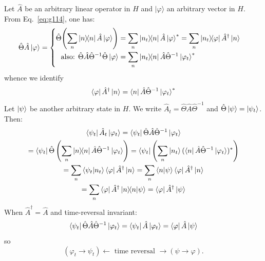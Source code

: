 \documentclass[12pt]{article}
\newcommand{\be}{\begin{equation}}
\newcommand{\ee}{\end{equation}}
\begin{document}
Let $\hat{A}$ be an arbitrary linear operator in $H$ and
$|\varphi\rangle$ an arbitrary vector in $H$. From Eq.~\eqref{eq:g114},
one has:
\be
\hat{\Theta} \hat{A} \ket{\varphi}=
\begin{cases}
\begin{aligned}
\hat{\Theta}\!\left(\sum_n\op{n}\hat{A}\ket{\varphi}\right) 
&= \sum_n \op{n_t}{n}\hat{A}\ket{\varphi}^*
= \sum_n \op{n_t}{\varphi}\hat{A}^{\dagger}\ket{n}\\
\text{also: }\hat{\Theta}\hat{A}\hat{\Theta}^{-1}\hat{\Theta}\ket{\varphi} 
&= \sum_n \op{n_t}{n}\hat{A}\hat{\Theta}^{-1}\ket{\varphi_t}^*
\end{aligned}
\end{cases}
\ee
whence we identify
\[
\bra{\varphi}\hat{A}^{\dagger}\ket{n} = \bra{n}\hat{A}\hat{\Theta}^{-1}\ket{\varphi_t}^*
\]
%
Let $\ket{\psi}$ be another arbitrary state in $H$. We write 
$\hat{A}_t = \hat{\Theta}\hat{A}\hat{\Theta}^{-1}$
and
$\hat{\Theta}\ket{\psi} = \ket{\psi_t}$.
Then:
\be
\begin{gathered}
\bra{\psi_t}\hat{A}_t\ket{\varphi_t} =
\bra{\psi_t}\hat{\Theta}\hat{A}\hat{\Theta}^{-1}\ket{\varphi_t}\\
 = \bra{\psi_t}\hat{\Theta}\left(
\sum_n\op{n}\hat{A}\hat{\Theta}^{-1}\ket{\varphi_t}
\right)
 = \bra{\psi_t}\left(
\sum_n\ket{n_t}(\bra{n}\hat{A}\hat{\Theta}^{-1}\ket{\varphi_t})^*
\right)\\
=\sum_n \bra{\psi_t}\ket{n_t} \bra{\varphi}\hat{A}^{\dagger}\ket{n}
=\sum_n \bra{n}\ket{\psi} \bra{\varphi}\hat{A}^{\dagger}\ket{n}\\
=\sum_n \bra{\varphi}\hat{A}^{\dagger} \ket{n}\!\!\bra{n}\ket{\psi}
= \bra{\varphi}\hat{A}^{\dagger}\ket{\psi}
\end{gathered}
\ee
When $\hat{A}^{\dagger} = \hat{A}$ and time-reversal invariant:
\be
\bra{\psi_t}\hat{\Theta}\hat{A}\hat{\Theta}^{-1}\ket{\varphi_t} = 
\bra{\psi_t}\hat{A}\ket{\varphi_t} =
\bra{\varphi}\hat{A}\ket{\psi}
\ee
so
\[
(\varphi_t \to \psi_t) \leftarrow \text{ time reversal }\rightarrow (\psi \to \varphi).
\]
\end{document}
